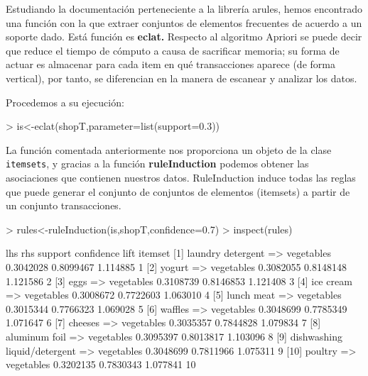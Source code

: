 \documentclass [a4paper] {article}
\begin{document}
{\bigskip
Estudiando la documentación perteneciente a la librería arules, hemos encontrado una función con la que extraer
conjuntos de elementos frecuentes de acuerdo a un soporte dado. Está función es \textbf{eclat.}
Respecto al algoritmo Apriori se puede decir que reduce el tiempo de cómputo a causa de sacrificar memoria; su
forma de actuar es almacenar para cada item en qué transacciones aparece (de forma vertical), por tanto, 
se diferencian en la manera de escanear y analizar los datos.

\bigskip
Procedemos a su ejecución:
\begin{Schunk}
\begin{Sinput}
> is<-eclat(shopT,parameter=list(support=0.3))
\end{Sinput}
\end{Schunk}

\bigskip
La función comentada anteriormente nos proporciona un objeto de la clase \texttt{itemsets}, y gracias a la función
\textbf{ruleInduction} podemos obtener las asociaciones que contienen nuestros datos. RuleInduction induce todas las reglas 
que puede generar el conjunto de conjuntos de elementos (itemsets) a partir de un conjunto transacciones.
\begin{Schunk}
\begin{Sinput}
> rules<-ruleInduction(is,shopT,confidence=0.7)
> inspect(rules)
\end{Sinput}
\begin{Soutput}
     lhs                               rhs          support   confidence lift     itemset
[1]  {laundry detergent}            => {vegetables} 0.3042028 0.8099467  1.114885  1     
[2]  {yogurt}                       => {vegetables} 0.3082055 0.8148148  1.121586  2     
[3]  {eggs}                         => {vegetables} 0.3108739 0.8146853  1.121408  3     
[4]  {ice cream}                    => {vegetables} 0.3008672 0.7722603  1.063010  4     
[5]  {lunch meat}                   => {vegetables} 0.3015344 0.7766323  1.069028  5     
[6]  {waffles}                      => {vegetables} 0.3048699 0.7785349  1.071647  6     
[7]  {cheeses}                      => {vegetables} 0.3035357 0.7844828  1.079834  7     
[8]  {aluminum foil}                => {vegetables} 0.3095397 0.8013817  1.103096  8     
[9]  {dishwashing liquid/detergent} => {vegetables} 0.3048699 0.7811966  1.075311  9     
[10] {poultry}                      => {vegetables} 0.3202135 0.7830343  1.077841 10     
\end{Soutput}
\end{Schunk}

}
\end{document}
